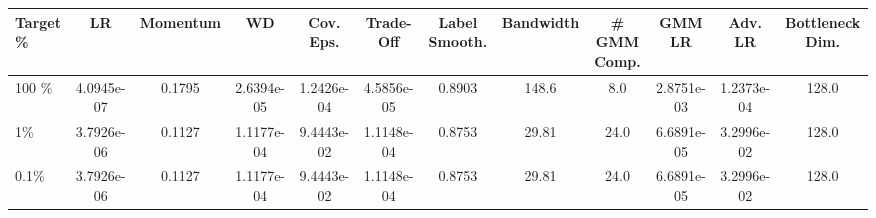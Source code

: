\begin{tabular}{l | c c c c c c c c c c c}
\toprule
Target \% & LR & Momentum & WD & Cov. Eps. & Trade-Off & Label Smooth. & Bandwidth & \# GMM Comp. & GMM LR  & Adv. LR & Bottleneck Dim. \\
\midrule
100 \% & 4.0945e-07 & 0.1795 & 2.6394e-05 & 1.2426e-04 & 4.5856e-05 & 0.8903 & 148.6 & 8.0 & 2.8751e-03 & 1.2373e-04 & 128.0 \\
1\% & 3.7926e-06 & 0.1127 & 1.1177e-04 & 9.4443e-02 & 1.1148e-04 & 0.8753 & 29.81 & 24.0 & 6.6891e-05 & 3.2996e-02 & 128.0 \\
0.1\% & 3.7926e-06 & 0.1127 & 1.1177e-04 & 9.4443e-02 & 1.1148e-04 & 0.8753 & 29.81 & 24.0 & 6.6891e-05 & 3.2996e-02 & 128.0 \\
\bottomrule
\end{tabular}

